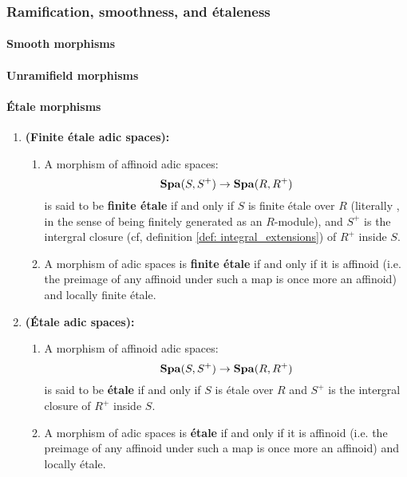             \subsubsection{Ramification, smoothness, and \'etaleness}
                \paragraph{Smooth morphisms}
                
                \paragraph{Unramifield morphisms}
            
                \paragraph{\'Etale morphisms}
                    \begin{definition} \label{def: etale_morphisms_of_adic_spaces}
                        \noindent
                        \begin{enumerate}
                            \item \textbf{(Finite \'etale adic spaces):} 
                                \begin{enumerate}
                                    \item A morphism of affinoid adic spaces:
                                        $$\mathbf{Spa}(S, S^+) \to \mathbf{Spa}(R, R^+)$$
                                    is said to be \textbf{finite \'etale} if and only if $S$ is finite \'etale over $R$ (literally , in the sense of being finitely generated as an $R$-module), and $S^+$ is the intergral closure (cf, definition \ref{def: integral_extensions}) of $R^+$ inside $S$.
                                    \item A morphism of adic spaces is \textbf{finite \'etale} if and only if it is affinoid (i.e. the preimage of any affinoid under such a map is once more an affinoid) and locally finite \'etale.
                                \end{enumerate}
                            \item \textbf{(\'Etale adic spaces):} 
                                \begin{enumerate}
                                    \item A morphism of affinoid adic spaces:
                                        $$\mathbf{Spa}(S, S^+) \to \mathbf{Spa}(R, R^+)$$
                                    is said to be \textbf{\'etale} if and only if $S$ is \'etale over $R$ and $S^+$ is the intergral closure of $R^+$ inside $S$.
                                    \item A morphism of adic spaces is \textbf{\'etale} if and only if it is affinoid (i.e. the preimage of any affinoid under such a map is once more an affinoid) and locally \'etale.
                                \end{enumerate}
                        \end{enumerate}
                    \end{definition}
